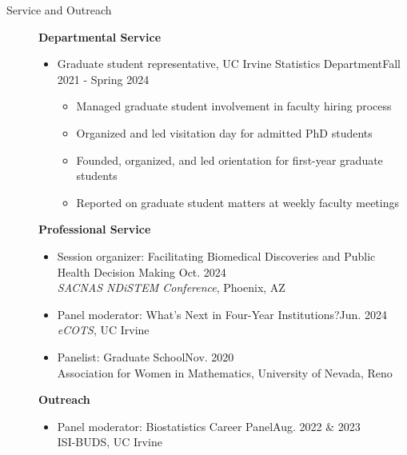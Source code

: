 \documentclass{article}
\begin{document}
	\begin{description}
		\vspace{-2mm}
		\item[Service and Outreach]\hspace*{.1in} 
		
		\textbf{Departmental Service}
		\begin{itemize}
			\item Graduate student representative, UC Irvine Statistics Department\hfill{Fall 2021 - Spring 2024}
			\begin{itemize}
				\item Managed graduate student involvement in faculty hiring process
				\vspace*{-1mm}
				\item Organized and led visitation day for admitted PhD students
				\vspace*{-1mm}
				\item Founded, organized, and led orientation for first-year graduate students
				\vspace*{-1mm}
				\item Reported on graduate student matters at weekly faculty meetings
			\end{itemize}
		\end{itemize}
		
		\textbf{Professional Service}
		\begin{itemize}
			\item Session organizer: Facilitating Biomedical Discoveries and Public Health Decision Making \hfill{Oct. 2024}\\
			\textit{SACNAS NDiSTEM Conference}, Phoenix, AZ
			
			\item Panel moderator: What's Next in Four-Year Institutions?\hfill{Jun. 2024}\\
			\textit{eCOTS}, UC Irvine %
			
			\item Panelist: Graduate School\hfill{Nov. 2020}\\
			Association for Women in Mathematics, University of Nevada, Reno %
		\end{itemize}
		
		\textbf{Outreach}
		\begin{itemize}
			\item Panel moderator: Biostatistics Career Panel\hfill{Aug. 2022 \& 2023}\\
			ISI-BUDS, UC Irvine
			

\end{itemize}
\end{description}
\end{document}
